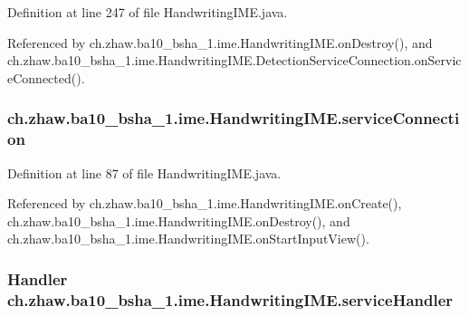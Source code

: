 Definition at line 247 of file HandwritingIME.java.

Referenced by ch.zhaw.ba10\_\-bsha\_\-1.ime.HandwritingIME.onDestroy(), and ch.zhaw.ba10\_\-bsha\_\-1.ime.HandwritingIME.DetectionServiceConnection.onServiceConnected().\hypertarget{classch_1_1zhaw_1_1ba10__bsha__1_1_1ime_1_1HandwritingIME_a327839f818f5782ff037e64ff386045f}{
\subsubsection[{serviceConnection}]{ {\bf ch.zhaw.ba10\_\-bsha\_\-1.ime.HandwritingIME.serviceConnection}}}
\label{classch_1_1zhaw_1_1ba10__bsha__1_1_1ime_1_1HandwritingIME_a327839f818f5782ff037e64ff386045f}


Definition at line 87 of file HandwritingIME.java.

Referenced by ch.zhaw.ba10\_\-bsha\_\-1.ime.HandwritingIME.onCreate(), ch.zhaw.ba10\_\-bsha\_\-1.ime.HandwritingIME.onDestroy(), and ch.zhaw.ba10\_\-bsha\_\-1.ime.HandwritingIME.onStartInputView().\hypertarget{classch_1_1zhaw_1_1ba10__bsha__1_1_1ime_1_1HandwritingIME_a3c53e6e79323d1574d50d493d76f290d}{
\subsubsection[{serviceHandler}]{\setlength{\rightskip}{0pt plus 5cm}Handler {\bf ch.zhaw.ba10\_\-bsha\_\-1.ime.HandwritingIME.serviceHandler}}}
\label{classch_1_1zhaw_1_1ba10__bsha__1_1_1ime_1_1HandwritingIME_a3c53e6e79323d1574d50d493d76f290d}


